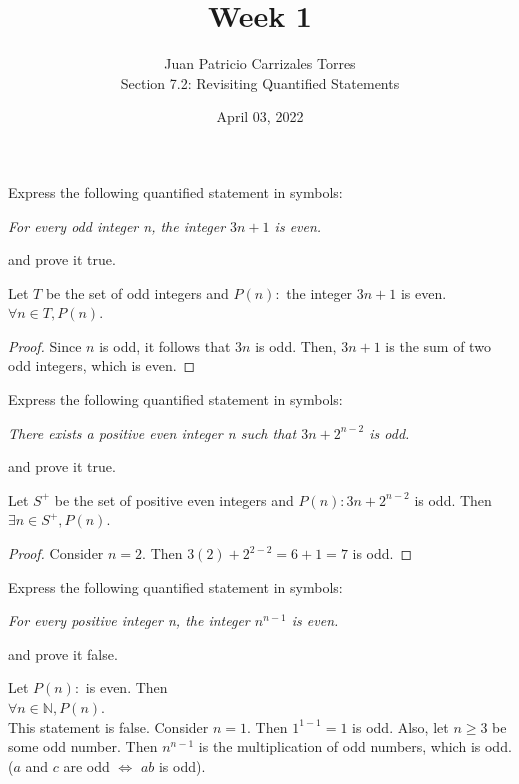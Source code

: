 \documentclass[12pt]{article}
\newcommand{\N}{\mathbb{N}}
\newenvironment{problem}[2][Problem]{\begin{trivlist}
		\item[\hskip \labelsep {\bfseries #1}\hskip \labelsep {\bfseries #2.}]}{\end{trivlist}}
\newenvironment{solution}[2][Solution]{\begin{trivlist}
		\item[\hskip \labelsep {\bfseries #1}\hskip \labelsep {\bfseries #2.}]}{\end{trivlist}}
\begin{document}
	
	\title{Week 1}
	\author{Juan Patricio Carrizales Torres \\
		Section 7.2: Revisiting Quantified Statements}
	\date{April 03, 2022}
	\maketitle

\begin{problem}{10}
	Express the following quantified statement in symbols:
	\begin{center}
		\textit{For every odd integer n, the integer $3n+1$ is even.}
	\end{center}
	and prove it true.
	\begin{solution}{}
		Let $T$ be the set of odd integers and $P(n):$ the integer $3n+1$ is even.\\
		
		$\forall n\in T, P(n)$.
		\begin{proof}
			Since $n$ is odd, it follows that $3n$ is odd. Then, $3n +1$ is the sum of two odd integers, which is even.
		\end{proof}
	\end{solution}
\end{problem}

\begin{problem}{11}
	Express the following quantified statement in symbols:
	\begin{center}
		\textit{There exists a positive even integer n such that $3n+2^{n-2}$ is odd.}
	\end{center}
	and prove it true.
	\begin{solution}{}
		Let $S^{+}$ be the set of positive even integers and $P(n): 3n+2^{n-2}$ is odd. Then\\
		
		$\exists n\in S^{+}, P(n)$.
		\begin{proof}
			Consider $n=2$. Then $3(2) + 2^{2-2} = 6 +1 = 7$ is odd.
		\end{proof} 
	\end{solution}
\end{problem}

\begin{problem}{12}
	Express the following quantified statement in symbols:
	\begin{center} 
		\textit{For every positive integer n, the integer $n^{n-1}$ is even.}
	\end{center}
	and prove it false.
	\begin{solution}{}
		Let $P(n):$ is even. Then\\
		$\forall n\in \N, P(n)$. \\
		 
		This statement is false. Consider $n=1$. Then $1^{1-1} = 1$ is odd. Also, let $n\geq 3$ be some odd number. Then $n^{n-1}$ is the multiplication of odd numbers, which is odd. ($a$ and $c$ are odd $\iff$ $ab$ is odd). 
	\end{solution}
\end{problem}
\end{document}
